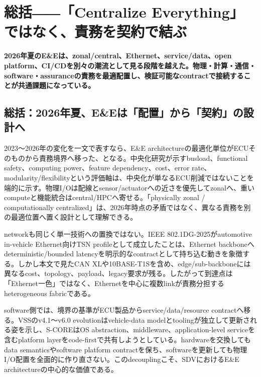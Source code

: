 \section{総括――「Centralize Everything」ではなく、責務を契約で結ぶ}
\noindent\textbf{2026年夏のE\&Eは、zonal/central、Ethernet、service/data、open platform、CI/CDを別々の潮流として見る段階を越えた。物理・計算・通信・software・assuranceの責務を最適配置し、検証可能なcontractで接続することが共通課題になっている。}\autocite{src-0d68a9a04e3d,src-4e0a35202b0f,src-d5d5a7ec3f4c,src-d63061aaba8e}

\begin{surveyarticlebody}
\subsection{総括：2026年夏、E\&Eは「配置」から「契約」の設計へ}

2023〜2026年の変化を一文で表すなら、E\&E architectureの最適化単位がECUそのものから責務境界へ移った、となる。中央化研究が示すbusload、functional safety、computing power、feature dependency、cost、error rate、modularity/flexibilityという評価軸は、中央化が単なるECU削減ではないことを端的に示す。物理I/Oは配線とsensor/actuatorへの近さを優先してzonalへ、重いcomputeと機能統合はcentral/HPCへ寄せる。「physically zonal / computationally centralized」は、2026年時点の矛盾ではなく、異なる責務を別の最適位置へ置く設計として理解できる。\autocite{src-6d738dbdfc39,src-d5d5a7ec3f4c}

networkも同じく単一技術への置換ではない。IEEE 802.1DG-2025がautomotive in-vehicle Ethernet向けTSN profileとして成立したことは、Ethernet backboneへdeterministic/bounded latencyを明示的なcontractとして持ち込む動きを象徴する。しかし本文で見たCAN XLや10BASE-T1Sを含め、edge/sub-backboneには異なるcost、topology、payload、legacy要求が残る。したがって到達点は「Ethernet一色」ではなく、Ethernetを中心に複数linkが責務分担するheterogeneous fabricである。\autocite{src-0d68a9a04e3d,src-4e0a35202b0f}

software側では、境界の基準がECU製品からservice/data/resource contractへ移る。VSSのv4.1〜v6.0 evolutionはvehicle-data modelとtoolingが独立して更新される姿を示し、S-COREはOS abstraction、middleware、application-level serviceを含むplatform layerをcode-firstで共有しようとしている。hardwareを交換してもdata semanticsやsoftware platform contractを保ち、softwareを更新しても物理I/O配置を全面的に作り直さない。このdecouplingこそ、SDVにおけるE\&E architectureの中心的な価値である。\autocite{src-1486b9718088,src-3ce752187789,src-971a21882f71,src-c89d0f167c6b,src-d63061aaba8e,src-e24ad9438abe}


\end{surveyarticlebody}
